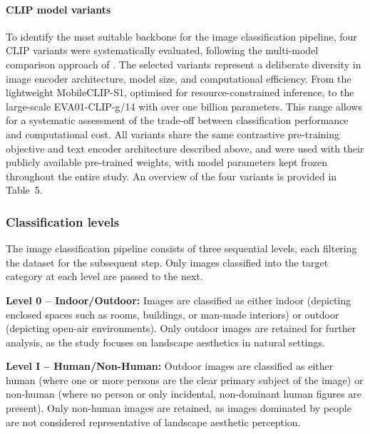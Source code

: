 \documentclass[hidelinks, 11pt]{article}
\begin{document}
\paragraph{CLIP model variants}
To identify the most suitable backbone for the image classification pipeline, four CLIP variants were systematically evaluated, following the multi-model comparison approach of \citet{liao_mapping_2025}. The selected variants represent a deliberate diversity in image encoder architecture, model size, and computational efficiency. From the lightweight MobileCLIP-S1, optimised for resource-constrained inference, to the large-scale EVA01-CLIP-g/14 with over one billion parameters. This range allows for a systematic assessment of the trade-off between classification performance and computational cost. All variants share the same contrastive pre-training objective and text encoder architecture described above, and were used with their publicly available pre-trained weights, with model parameters kept frozen throughout the entire study. An overview of the four variants is provided in Table~5.

\subsubsection{Classification levels}
The image classification pipeline consists of three sequential levels, each filtering the dataset for the subsequent step. Only images classified into the target category at each level are passed to the next.

\textbf{Level 0 -- Indoor/Outdoor:} Images are classified as either indoor (depicting enclosed spaces such as rooms, buildings, or man-made interiors) or outdoor (depicting open-air environments). Only outdoor images are retained for further analysis, as the study focuses on landscape aesthetics in natural settings.

\textbf{Level I -- Human/Non-Human:} Outdoor images are classified as either human (where one or more persons are the clear primary subject of the image) or non-human (where no person or only incidental, non-dominant human figures are present). Only non-human images are retained, as images dominated by people are not considered representative of landscape aesthetic perception.
\end{document}
